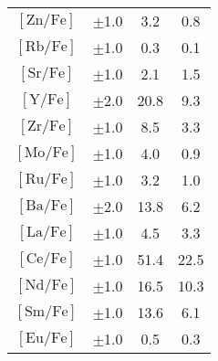 \begin{table}
\begin{tabular}{cccc}
    $\mathrm{[Zn/Fe]}$ & $\pm$1.0 & 3.2 & 0.8 \\
    $\mathrm{[Rb/Fe]}$ & $\pm$1.0 & 0.3 & 0.1 \\
    $\mathrm{[Sr/Fe]}$ & $\pm$1.0 & 2.1 & 1.5 \\
    $\mathrm{[Y/Fe]}$ & $\pm$2.0 & 20.8 & 9.3 \\
    $\mathrm{[Zr/Fe]}$ & $\pm$1.0 & 8.5 & 3.3 \\
    $\mathrm{[Mo/Fe]}$ & $\pm$1.0 & 4.0 & 0.9 \\
    $\mathrm{[Ru/Fe]}$ & $\pm$1.0 & 3.2 & 1.0 \\
    $\mathrm{[Ba/Fe]}$ & $\pm$2.0 & 13.8 & 6.2 \\
    $\mathrm{[La/Fe]}$ & $\pm$1.0 & 4.5 & 3.3 \\
    $\mathrm{[Ce/Fe]}$ & $\pm$1.0 & 51.4 & 22.5 \\
    $\mathrm{[Nd/Fe]}$ & $\pm$1.0 & 16.5 & 10.3 \\
    $\mathrm{[Sm/Fe]}$ & $\pm$1.0 & 13.6 & 6.1 \\
    $\mathrm{[Eu/Fe]}$ & $\pm$1.0 & 0.5 & 0.3 \\
    \hline
    \end{tabular}
\end{table}

